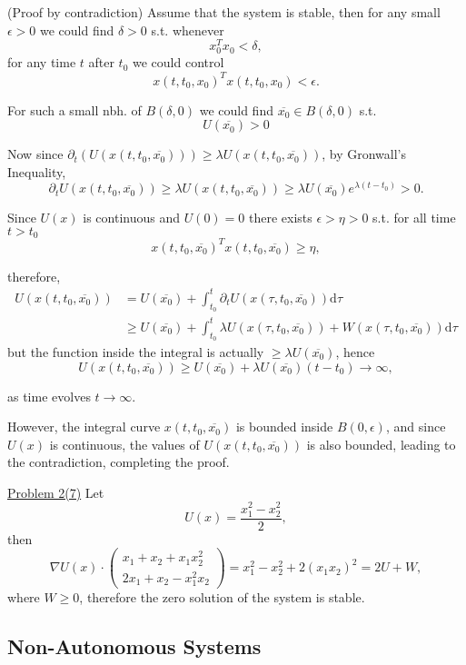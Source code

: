 \documentclass{tufte-handout}
\begin{document}
\begin{formalproof} 
	(Proof by contradiction)
	Assume that the system is stable, then for any small $\epsilon>0$ we could find $\delta>0$ s.t. whenever \[ x_0^T x_0 < \delta, \]
	for any time $t$ after $t_0$ we could control \[ x(t,t_0,x_0)^Tx(t,t_0,x_0)< \epsilon.  \]

For such a small nbh. of $B(\delta,0)$ we could find $\overline{x_0} \in B(\delta,0)$ s.t. \[ U(\overline{x_0})> 0 \]

Now since $\partial_t (U(x(t,t_0,\overline{x_0}))) \geq \lambda U(x(t,t_0,\overline{x_0}))$, by Gronwall's Inequality, \[ \partial_t U(x(t,t_0,\overline{x_0})) \geq \lambda U(x(t,t_0,\overline{x_0})) \geq \lambda U(\overline{x_0}) e^{\lambda(t-t_0)}> 0. \]

Since $U(x)$ is continuous and $U(0)=0$ there exists $\epsilon >\eta> 0$ s.t. for all time $t>t_0$ \[ x(t,t_0,\overline{x_0})^T x(t,t_0,\overline{x_0}) \geq \eta, \]

therefore, 
\begin{align*}
  U(x(t,t_0,\overline{x_0})) &= U(\overline{x_0})+ \int_{t_0}^t \partial_t U(x(\tau,t_0,\overline{x_0})) \text{d}\tau \\
                             &\geq U(\overline{x_0})+ \int_{t_0}^t \lambda U(x(\tau,t_0,\overline{x_0})) + W(x(\tau,t_0,\overline{x_0})) \text{d}\tau
\end{align*}
but the function inside the integral is actually $\geq \lambda U(\overline{x_0})$, hence \[ U(x(t,t_0,\overline{x_0})) \geq U(\overline{x_0}) + \lambda U(\overline{x_0})(t-t_0) \to \infty, \]

as time evolves $t\to\infty$. 

However, the integral curve $x(t,t_0,\overline{x_0})$ is bounded inside $B(0,\epsilon)$, and since $U(x)$ is continuous, the values of $U(x(t,t_0,\overline{x_0}))$ is also bounded, leading to the contradiction, completing the proof.
\end{formalproof}

\underline{Problem 2(7)} Let \[ U(x)=\frac{x_1^2-x_2^2}{2}, \]
then \[ \nabla U(x) \cdot 
	\begin{pmatrix}
		x_1+x_2+x_1x_2^2 \\
		2x_1+x_2-x_1^2 x_2
	\end{pmatrix}
	= x_1^2-x_2^2+2(x_1x_2)^2=2U+W,
\]
where $W\geq 0$, therefore the zero solution of the system is stable.

\subsection{Non-Autonomous Systems}
\cite{2001}
\end{document}
